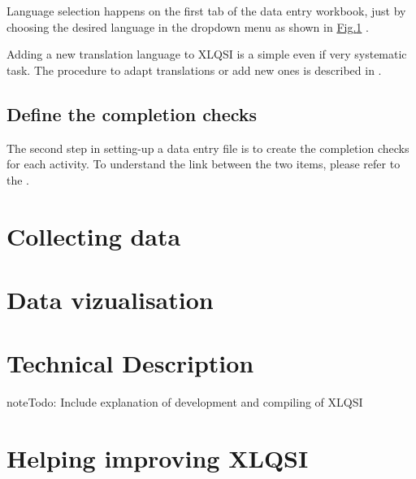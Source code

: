 \documentclass[letterpaper,10pt,english]{sphinxmanual}
\begin{document}
Language selection happens on the first tab of the data entry workbook, just by choosing the desired language in the dropdown menu as shown in \hyperref[\detokenize{create_data_entry:translation}]{Fig.\@ \ref{\detokenize{create_data_entry:translation}}} .

\begin{figure}[htbp]
\centering

\noindent{}
\label{\detokenize{create_data_entry:translation}}\end{figure}

Adding a new translation language to XLQSI is a simple even if very systematic task. The procedure to adapt translations or add new ones is described in {\hyperref[\detokenize{technical::doc}]{}}.


\section{Define the completion checks}
\label{\detokenize{create_data_entry:id1}}\label{\detokenize{create_data_entry:define-the-completion-checks}}
The second step in setting-up a data entry file is to create the completion checks for each activity. To understand the link between the two items, please refer to the {\hyperref[\detokenize{intro::doc}]{}}.


\chapter{Collecting data}
\label{\detokenize{fill_data_entry:collecting-data}}\label{\detokenize{fill_data_entry::doc}}

\chapter{Data vizualisation}
\label{\detokenize{data_viz:data-vizualisation}}\label{\detokenize{data_viz::doc}}

\chapter{Technical Description}
\label{\detokenize{technical::doc}}\label{\detokenize{technical:technical-description}}
\begin{sphinxadmonition}{note}{\label{technical:index-0}Todo:}
Include explanation of development and compiling of XLQSI
\end{sphinxadmonition}


\chapter{Helping improving XLQSI}
\label{\detokenize{contribute::doc}}\label{\detokenize{contribute:helping-improving-xlqsi}}


\renewcommand{\indexname}{Index}
\printindex
\end{document}
